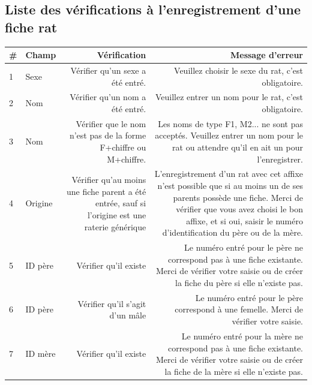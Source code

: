 ﻿\documentclass[a4paper,10pt]{article}
\begin{document}

\subsection{Liste des vérifications à l'enregistrement d'une fiche rat}
\label{app:verifs}
\small
\noindent\begin{tabularx}{\textwidth}{|l|l|R|R|}\hline
\textbf{\#} & \textbf{Champ} & \textbf{Vérification} & \textbf{Message d'erreur}\\\hline

1 & Sexe & Vérifier qu'un sexe a été entré. & Veuillez choisir le sexe du rat, c'est obligatoire. \\\hline

2 & Nom & Vérifier qu'un nom a été entré. &Veuillez entrer un nom pour le rat, c'est obligatoire. \\\hline

3 & Nom & Vérifier que le nom n'est pas de la forme F+chiffre ou M+chiffre. & Les noms de type F1, M2... ne sont pas acceptés. Veuillez entrer un nom pour le rat ou attendre qu'il en ait un pour l'enregistrer. \\\hline

4 & Origine & Vérifier qu'au moins une fiche parent a été entrée, sauf si l'origine est une raterie générique & L'enregistrement d'un rat avec cet affixe n'est possible que si au moins un de ses parents possède une fiche. Merci de vérifier que vous avez choisi le bon affixe, et si oui, saisir le numéro d'identification du père ou de la mère. \\\hline

5 & ID père & Vérifier qu'il existe & Le numéro entré pour le père ne correspond pas à une fiche existante. Merci de vérifier votre saisie ou de créer la fiche du père si elle n'existe pas. \\\hline


6 & ID père & Vérifier qu'il s'agit d'un mâle & Le numéro entré pour le père correspond à une femelle. Merci de vérifier votre saisie.\\\hline


7 & ID mère & Vérifier qu'il existe & Le numéro entré pour la mère ne correspond pas à une fiche existante. Merci de vérifier votre saisie ou de créer la fiche de la mère si elle n'existe pas.\\\hline



\end{tabularx}
\end{document}
